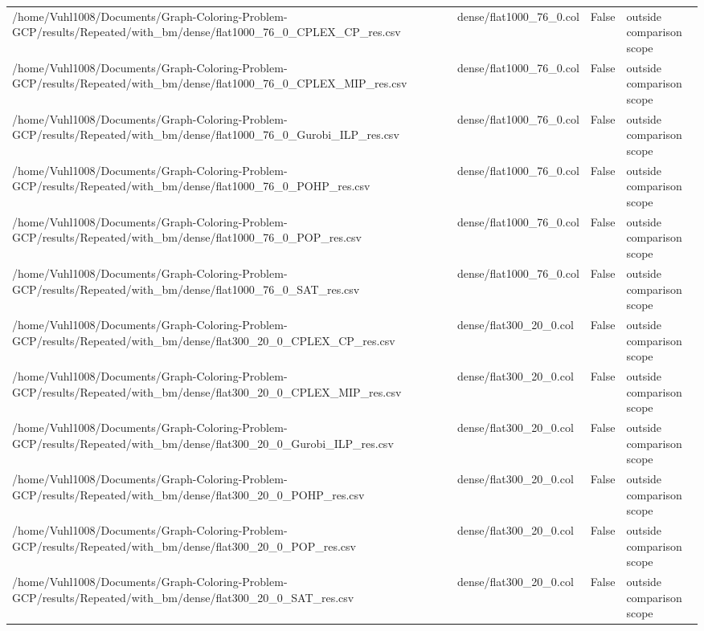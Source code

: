 \begin{table}[htbp]
\begin{tabular}{llll}
/home/Vuhl1008/Documents/Graph-Coloring-Problem-GCP/results/Repeated/with\_bm/dense/flat1000\_76\_0\_CPLEX\_CP\_res.csv & dense/flat1000\_76\_0.col & False & outside comparison scope \\
/home/Vuhl1008/Documents/Graph-Coloring-Problem-GCP/results/Repeated/with\_bm/dense/flat1000\_76\_0\_CPLEX\_MIP\_res.csv & dense/flat1000\_76\_0.col & False & outside comparison scope \\
/home/Vuhl1008/Documents/Graph-Coloring-Problem-GCP/results/Repeated/with\_bm/dense/flat1000\_76\_0\_Gurobi\_ILP\_res.csv & dense/flat1000\_76\_0.col & False & outside comparison scope \\
/home/Vuhl1008/Documents/Graph-Coloring-Problem-GCP/results/Repeated/with\_bm/dense/flat1000\_76\_0\_POHP\_res.csv & dense/flat1000\_76\_0.col & False & outside comparison scope \\
/home/Vuhl1008/Documents/Graph-Coloring-Problem-GCP/results/Repeated/with\_bm/dense/flat1000\_76\_0\_POP\_res.csv & dense/flat1000\_76\_0.col & False & outside comparison scope \\
/home/Vuhl1008/Documents/Graph-Coloring-Problem-GCP/results/Repeated/with\_bm/dense/flat1000\_76\_0\_SAT\_res.csv & dense/flat1000\_76\_0.col & False & outside comparison scope \\
/home/Vuhl1008/Documents/Graph-Coloring-Problem-GCP/results/Repeated/with\_bm/dense/flat300\_20\_0\_CPLEX\_CP\_res.csv & dense/flat300\_20\_0.col & False & outside comparison scope \\
/home/Vuhl1008/Documents/Graph-Coloring-Problem-GCP/results/Repeated/with\_bm/dense/flat300\_20\_0\_CPLEX\_MIP\_res.csv & dense/flat300\_20\_0.col & False & outside comparison scope \\
/home/Vuhl1008/Documents/Graph-Coloring-Problem-GCP/results/Repeated/with\_bm/dense/flat300\_20\_0\_Gurobi\_ILP\_res.csv & dense/flat300\_20\_0.col & False & outside comparison scope \\
/home/Vuhl1008/Documents/Graph-Coloring-Problem-GCP/results/Repeated/with\_bm/dense/flat300\_20\_0\_POHP\_res.csv & dense/flat300\_20\_0.col & False & outside comparison scope \\
/home/Vuhl1008/Documents/Graph-Coloring-Problem-GCP/results/Repeated/with\_bm/dense/flat300\_20\_0\_POP\_res.csv & dense/flat300\_20\_0.col & False & outside comparison scope \\
/home/Vuhl1008/Documents/Graph-Coloring-Problem-GCP/results/Repeated/with\_bm/dense/flat300\_20\_0\_SAT\_res.csv & dense/flat300\_20\_0.col & False & outside comparison scope \\

\end{tabular}
\end{table}
